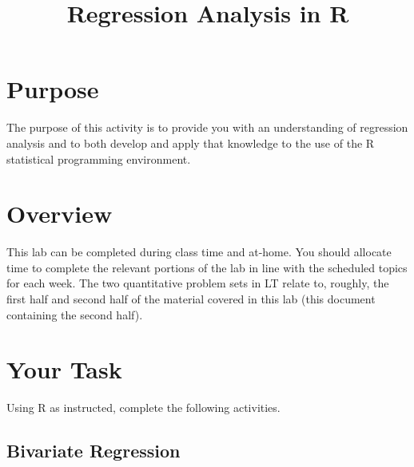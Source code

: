 \documentclass[a4paper,12pt]{article}
\title{Regression Analysis in R}
\author{}
\date{}
\begin{document}
\vspace{-4em}

\maketitle

\vspace{-4em}

\section{Purpose}

The purpose of this activity is to provide you with an understanding of regression analysis and to both develop and apply that knowledge to the use of the R statistical programming environment.

\section{Overview}

This lab can be completed during class time and at-home. You should allocate time to complete the relevant portions of the lab in line with the scheduled topics for each week. The two quantitative problem sets in LT relate to, roughly, the first half and second half of the material covered in this lab (this document containing the second half).

\section{Your Task}

Using R as instructed, complete the following activities.

\subsection{Bivariate Regression}
\end{document}

